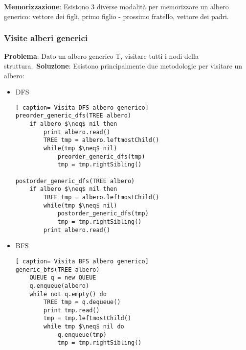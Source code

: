 \documentclass[../cheatSheetAlgoritmi.tex]{subfiles}
\begin{document}
\textbf{Memorizzazione}: Esistono 3 diverse modalità per memorizzare un albero generico: vettore dei figli, primo figlio - prossimo fratello, vettore dei padri.\
\newpage

\subsubsection{Visite alberi generici}
\textbf{Problema}: Dato un albero generico T, visitare tutti i nodi della struttura.\
\textbf{Soluzione}: Esistono principalmente due metodologie per visitare un albero:
\begin{itemize}
	\item DFS
\begin{lstlisting}[ caption= Visita DFS albero generico]
preorder_generic_dfs(TREE albero)
	if albero $\neq$ nil then
		print albero.read()
		TREE tmp = albero.leftmostChild()
		while(tmp $\neq$ nil)
			preorder_generic_dfs(tmp)
			tmp = tmp.rightSibling()
    
postorder_generic_dfs(TREE albero)
	if albero $\neq$ nil then
		TREE tmp = albero.leftmostChild()
		while(tmp $\neq$ nil)
			postorder_generic_dfs(tmp)
			tmp = tmp.rightSibling()
		print albero.read()
\end{lstlisting}
 	\item BFS
\begin{lstlisting}[ caption= Visita BFS albero generico]
generic_bfs(TREE albero)
	QUEUE q = new QUEUE
	q.enqueue(albero)
	while not q.empty() do
		TREE tmp = q.dequeue()
		print tmp.read()
		tmp = tmp.leftmostChild()
		while tmp $\neq$ nil do
			q.enqueue(tmp)
			tmp = tmp.rightSibling()
\end{lstlisting}
\end{itemize}
\newpage
\end{document}
